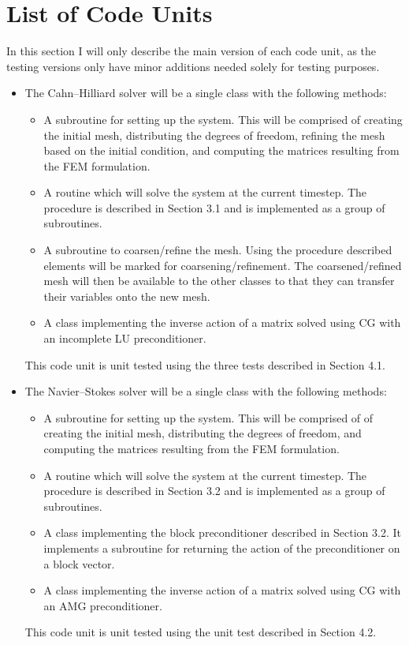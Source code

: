 \documentclass[11pt,fullpage]{article}
\theoremstyle{lemma}
\theoremstyle{definition}
\theoremstyle{lemma}
\begin{document}
\section{List of Code Units}
In this section I will only describe the main version of each code unit, as the testing versions only have minor additions needed solely for testing purposes.
\begin{itemize}
	\item The Cahn--Hilliard solver will be a single class with the following methods:
	\begin{itemize}
		\item A subroutine for setting up the system. This will be comprised of creating the initial mesh, distributing the degrees of freedom, refining the mesh based on the initial condition, and computing the matrices resulting from the FEM formulation.
		\item A routine which will solve the system at the current timestep. The procedure is described in Section 3.1 and is implemented as a group of subroutines.
		\item A subroutine to coarsen/refine the mesh. Using the procedure described elements will be marked for coarsening/refinement. The coarsened/refined mesh will then be available to the other classes to that they can transfer their variables onto the new mesh.
		\item A class implementing the inverse action of a matrix solved using CG with an incomplete LU preconditioner.
	\end{itemize}
	This code unit is unit tested using the three tests described in Section 4.1.
	
	\item The Navier--Stokes solver will be a single class with the following methods:
	\begin{itemize}
		\item A subroutine for setting up the system. This will be comprised of of creating the initial mesh, distributing the degrees of freedom, and computing the matrices resulting from the FEM formulation.
		\item A routine which will solve the system at the current timestep. The procedure is described in Section 3.2 and is implemented as a group of subroutines.
		\item A class implementing the block preconditioner described in Section 3.2. It implements a subroutine for returning the action of the preconditioner on a block vector.
		\item A class implementing the inverse action of a matrix solved using CG with an AMG preconditioner.
	\end{itemize} 
	This code unit is unit tested using the unit test described in Section 4.2.
	

\end{itemize}
\end{document}
